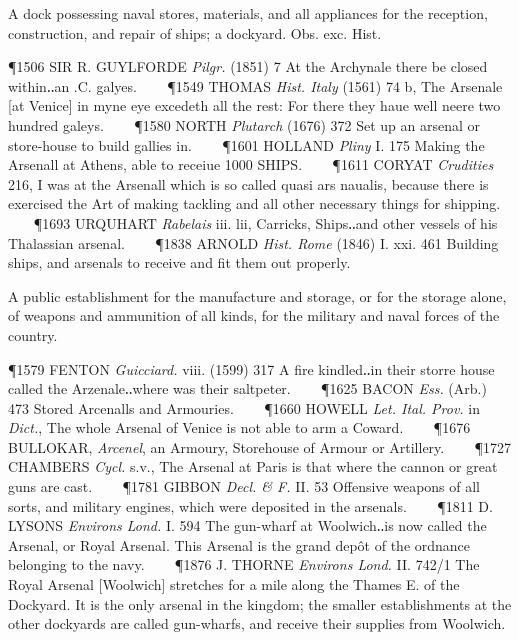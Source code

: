 \begin{description}[wide, labelwidth=!, labelindent=0pt]
\begin{myenumerate}

 A dock possessing naval stores, materials, and all appliances for the reception, construction, and repair of ships; a dockyard. Obs. exc. Hist.

\P 1506 SIR R. GUYLFORDE  \textit{Pilgr.} (1851) 7 At the Archynale there be closed within‥an .C. galyes.    
\P 1549 THOMAS  \textit{Hist. Italy} (1561) 74 b, The Arsenale [at Venice] in myne eye excedeth all the rest: For there they haue well neere two hundred galeys.    
\P 1580 NORTH  \textit{Plutarch} (1676) 372 Set up an arsenal or store-house to build gallies in.    
\P 1601 HOLLAND  \textit{Pliny} I. 175 Making the Arsenall at Athens, able to receiue 1000 SHIPS.    
\P 1611 CORYAT  \textit{Crudities} 216, I was at the Arsenall which is so called quasi ars naualis, because there is exercised the Art of making tackling and all other necessary things for shipping.    
\P 1693 URQUHART  \textit{Rabelais} iii. lii, Carricks, Ships‥and other vessels of his Thalassian arsenal.    
\P 1838 ARNOLD  \textit{Hist. Rome} (1846) I. xxi. 461 Building ships, and arsenals to receive and fit them out properly.

 A public establishment for the manufacture and storage, or for the storage alone, of weapons and ammunition of all kinds, for the military and naval forces of the country.

\P 1579 FENTON  \textit{Guicciard.} viii. (1599) 317 A fire kindled‥in their storre house called the Arzenale‥where was their saltpeter.    
\P 1625 BACON  \textit{Ess.} (Arb.) 473 Stored Arcenalls and Armouries.    
\P 1660 HOWELL  \textit{Let. Ital. Prov.} in \textit{Dict.}, The whole Arsenal of Venice is not able to arm a Coward.    
\P 1676 BULLOKAR,  \textit{Arcenel}, an Armoury, Storehouse of Armour or Artillery.    
\P 1727 CHAMBERS  \textit{Cycl.} s.v., The Arsenal at Paris is that where the cannon or great guns are cast.    
\P 1781 GIBBON  \textit{Decl. \& F.} II. 53 Offensive weapons of all sorts, and military engines, which were deposited in the arsenals.    
\P 1811 D. LYSONS  \textit{Environs Lond.} I. 594 The gun-wharf at Woolwich‥is now called the Arsenal, or Royal Arsenal. This Arsenal is the grand depôt of the ordnance belonging to the navy.    
\P 1876 J. THORNE  \textit{Environs Lond.} II. 742/1 The Royal Arsenal [Woolwich] stretches for a mile along the Thames E. of the Dockyard. It is the only arsenal in the kingdom; the smaller establishments at the other dockyards are called gun-wharfs, and receive their supplies from Woolwich.


\end{myenumerate}
\end{description}
